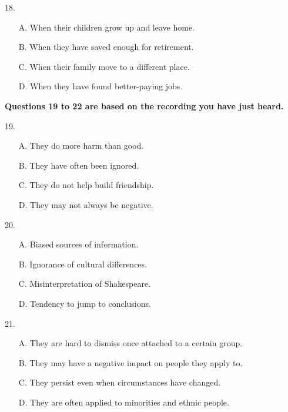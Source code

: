 \documentclass[UTF8,11pt]{ctexart}
\begin{document}
18.


\begin{itemize}[leftmargin=2em,itemsep=.2em,topsep=.4em]\item[A.] When their children grow up and leave home.
\item[B.] When they have saved enough for retirement.
\end{itemize}

\begin{itemize}[leftmargin=2em,itemsep=.2em,topsep=.4em]\item[C.] When their family move to a different place.
\item[D.] When they have found better-paying jobs.
\end{itemize}

\textbf{Questions 19 to 22 are based on the recording you have just heard.}


19.


\begin{itemize}[leftmargin=2em,itemsep=.2em,topsep=.4em]\item[A.] They do more harm than good.
\item[B.] They have often been ignored.
\item[C.] They do not help build friendship.
\item[D.] They may not always be negative.
\end{itemize}

20.


\begin{itemize}[leftmargin=2em,itemsep=.2em,topsep=.4em]\item[A.] Biased sources of information.
\item[B.] Ignorance of cultural differences.
\item[C.] Misinterpretation of Shakespeare.
\item[D.] Tendency to jump to conclusions.
\end{itemize}

21.


\begin{itemize}[leftmargin=2em,itemsep=.2em,topsep=.4em]\item[A.] They are hard to dismiss once attached to a certain group.
\item[B.] They may have a negative impact on people they apply to.
\item[C.] They persist even when circumstances have changed.
\item[D.] They are often applied to minorities and ethnic people.
\end{itemize}
\end{document}
